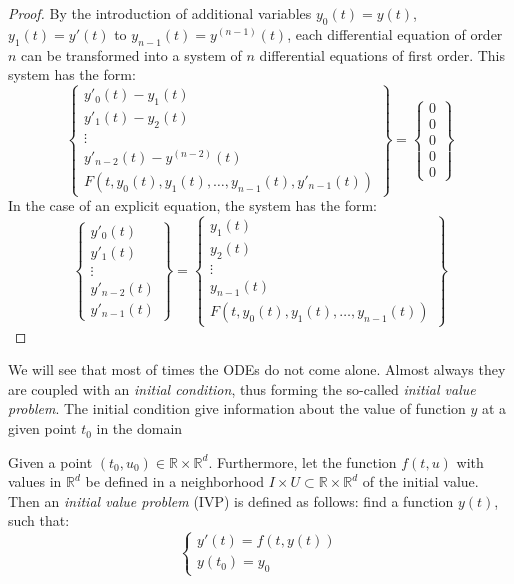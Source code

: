 \begin{proof}
	By the introduction of additional variables $y_0(t)=y(t)$, $y_1(t)=y'(t)$ to	$y_{n-1}(t) = y^{(n-1)}(t)$, each differential equation of order $n$ can be transformed into a system of $n$ differential equations of first order. This system has the form:
	\begin{equation}
		\begin{Bmatrix}
			y'_0(t) - y_1(t) \\
			y'_1(t) - y_2(t) \\
			\vdots \\
			y'_{n-2}(t) - y^{(n-2)}(t) \\
			F\left(t,y_0(t),y_1(t),\dots,y_{n-1}(t), y'_{n-1}(t)\right)
		\end{Bmatrix} = 
		\begin{Bmatrix}
			0 \\ 0 \\ 0 \\ 0 \\ 0
		\end{Bmatrix}
	\end{equation}
	In the case of an explicit equation, the system has the form:
	\begin{equation}
	\begin{Bmatrix}
		y'_0(t) \\
		y'_1(t) \\
		\vdots \\
		y'_{n-2}(t) \\
		y'_{n-1}(t)
	\end{Bmatrix} = 
	\begin{Bmatrix}
		y_1(t) \\
		y_2(t) \\
		\vdots \\
		y_{n-1}(t) \\
		F\left(t,y_0(t),y_1(t),\dots,y_{n-1}(t)\right)
	\end{Bmatrix}
	\end{equation}
\end{proof}

We will see that most of times the ODEs do not come alone. Almost always they are coupled with an \textit{initial condition}, thus forming the so-called \textit{initial value problem}. The initial condition give information about the value of function $y$ at a given point $t_0$ in the domain

\begin{definition}
	Given a point $(t_0,u_0) \in \mathbb{R} \times \mathbb{R}^d$. Furthermore, let the function $f(t,u)$ with values in $\mathbb{R}^d$ be defined in a neighborhood $I \times U \subset \mathbb{R} \times \mathbb{R}^d$ of the initial value. Then an \textit{initial value problem} (IVP) is	defined as follows: find a function $y(t)$, such that:
	\begin{equation}
	\begin{cases}
	y'(t) = f(t,y(t)) \\
	y(t_0) = y_0
	\end{cases}
	\end{equation}
\end{definition}

